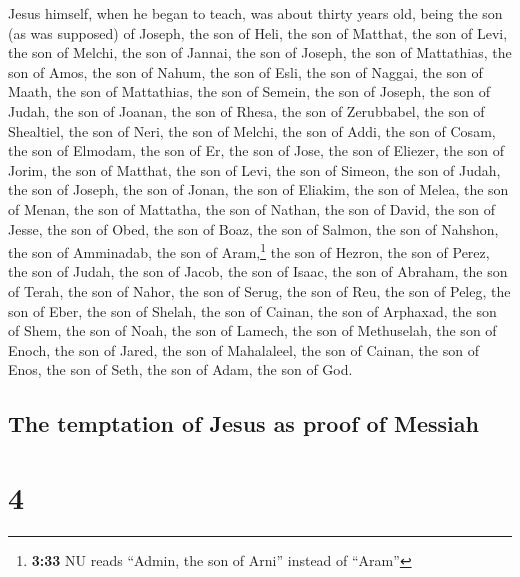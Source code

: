  Jesus himself, when he began to teach, was about thirty
years old, being the son (as was supposed) of Joseph, the son of Heli,
 the son of Matthat, the son of Levi, the son of Melchi,
the son of Jannai, the son of Joseph,  the son of
Mattathias, the son of Amos, the son of Nahum, the son of Esli, the son
of Naggai,  the son of Maath, the son of Mattathias, the
son of Semein, the son of Joseph, the son of Judah,  the
son of Joanan, the son of Rhesa, the son of Zerubbabel, the son of
Shealtiel, the son of Neri,  the son of Melchi, the son
of Addi, the son of Cosam, the son of Elmodam, the son of Er,
 the son of Jose, the son of Eliezer, the son of Jorim,
the son of Matthat, the son of Levi,  the son of Simeon,
the son of Judah, the son of Joseph, the son of Jonan, the son of
Eliakim,  the son of Melea, the son of Menan, the son of
Mattatha, the son of Nathan, the son of David,  the son
of Jesse, the son of Obed, the son of Boaz, the son of Salmon, the son
of Nahshon,  the son of Amminadab, the son of
Aram,\footnote{\textbf{3:33} NU reads ``Admin, the son of Arni'' instead
  of ``Aram''} the son of Hezron, the son of Perez, the son of Judah,
 the son of Jacob, the son of Isaac, the son of Abraham,
the son of Terah, the son of Nahor,  the son of Serug,
the son of Reu, the son of Peleg, the son of Eber, the son of Shelah,
 the son of Cainan, the son of Arphaxad, the son of Shem,
the son of Noah, the son of Lamech,  the son of
Methuselah, the son of Enoch, the son of Jared, the son of Mahalaleel,
the son of Cainan,  the son of Enos, the son of Seth, the
son of Adam, the son of God.

\hypertarget{the-temptation-of-jesus-as-proof-of-messiah}{%
\subsection{The temptation of Jesus as proof of
Messiah}\label{the-temptation-of-jesus-as-proof-of-messiah}}

\hypertarget{section-3}{%
\section{4}\label{section-3}}


